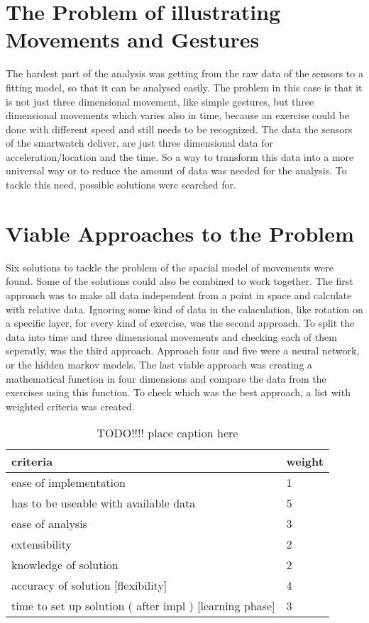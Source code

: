 
\section{The Problem of illustrating Movements and Gestures}

The hardest part of the analysis was getting from the raw data of the sensors to a fitting model, so that it can be analysed easily. The problem in this case is that it is not just three 	dimensional movement, like simple gestures, but three dimensional movements which varies also in time, because an exercise could be done with different speed and still needs to be recognized. The data the sensors of the smartwatch deliver, are just three dimensional data for acceleration/location and the time. So a way to transform this data into a more universal way or to reduce the amount of data was needed for the analysis. To tackle this need, possible solutions were searched for.

\section{Viable Approaches to the Problem}

Six solutions to tackle the problem of the spacial model of movements were found. Some of the solutions could also be combined to work together. The first approach was to make all data independent from a point in space and calculate with relative data. Ignoring some kind of data in the calaculation, like rotation on a specific layer, for every kind of exercise, was the second approach. To split the data into time and three dimensional movements and checking each of them seperatly, was the third approach. Approach four and five were a neural network, or the hidden markov models. The last viable approach was creating a mathematical function in four dimensions and compare the data from the exercises using this function.
\newline
\newline
To check which was the best approach, a list with weighted criteria was created.

\begin{table}[h]
\begin{tabular}{|l|l|}
\hline
	\textbf{criteria} & \textbf{weight} \\
\hline
	ease of implementation & 1\\
\hline
	has to be useable with available data & 5\\
\hline
	ease of analysis & 3\\
\hline
	extensibility & 2\\
\hline
	knowledge of solution & 2\\
\hline
	accuracy of solution [flexibility] & 4\\
\hline
	time to set up solution ( after impl )
[learning phase] & 3\\
\hline

\end{tabular}
\caption{ TODO!!!! place caption here  }
\end{table}

